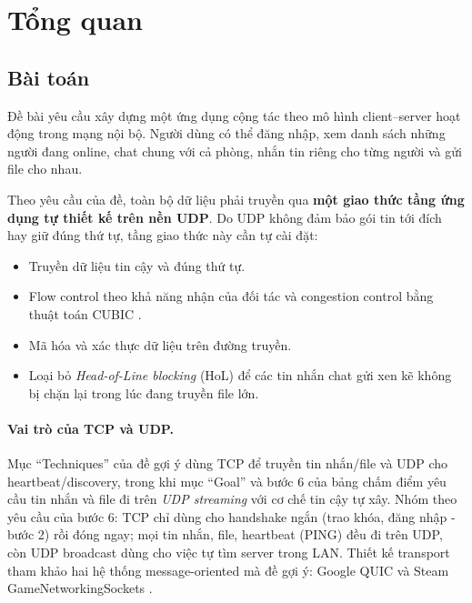 \section{Tổng quan}
\label{sec:tong-quan}

\subsection{Bài toán}
Đề bài yêu cầu xây dựng một ứng dụng cộng tác theo mô hình client--server hoạt động trong mạng nội bộ.
Người dùng có thể đăng nhập, xem danh sách những người đang online, chat chung với cả phòng, nhắn
tin riêng cho từng người và gửi file cho nhau.

Theo yêu cầu của đề, toàn bộ dữ liệu phải truyền qua \textbf{một giao thức tầng ứng dụng tự thiết kế trên nền UDP}. Do UDP không đảm bảo gói tin tới đích hay giữ đúng thứ tự, tầng giao thức này cần tự cài đặt:
\begin{itemize}
  \item Truyền dữ liệu tin cậy và đúng thứ tự.
  \item Flow control theo khả năng nhận của đối tác và congestion control bằng thuật toán CUBIC \cite{rfc9438}.
  \item Mã hóa và xác thực dữ liệu trên đường truyền.
  \item Loại bỏ \emph{Head-of-Line blocking} (HoL) để các tin nhắn chat gửi xen kẽ không bị chặn lại trong lúc đang truyền file lớn.
\end{itemize}

\paragraph{Vai trò của TCP và UDP.} Mục ``Techniques'' của đề gợi ý dùng TCP để truyền tin nhắn/file và UDP cho
heartbeat/discovery, trong khi mục ``Goal'' và bước 6 của bảng chấm điểm yêu cầu tin nhắn và file đi trên
\emph{UDP streaming} với cơ chế tin cậy tự xây. Nhóm theo yêu cầu của bước 6: TCP chỉ dùng cho handshake ngắn
(trao khóa, đăng nhập - bước 2) rồi đóng ngay; mọi tin nhắn, file, heartbeat (PING) đều đi trên UDP, còn UDP
broadcast dùng cho việc tự tìm server trong LAN. Thiết kế transport tham khảo hai hệ thống message-oriented mà đề
gợi ý: Google QUIC \cite{rfc9000,rfc9002} và Steam GameNetworkingSockets \cite{valve-gns}.

